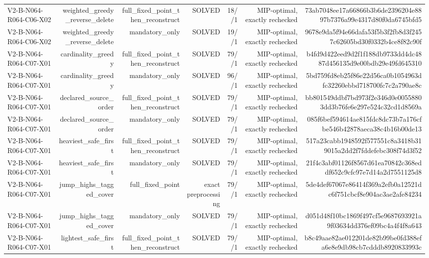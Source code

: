 {\begin{longtable}{lrrrrrr}
V2-B-N064-R064-C06-X02 & weighted\_greedy\_reverse\_delete & full\_fixed\_point\_then\_reconstruct & SOLVED & 18//1 & MIP-optimal, exactly rechecked & 73ab7048ee17a66866b3b6de2396204e8897b7376a99e4317d80f0da6745bfd5 \\
V2-B-N064-R064-C06-X02 & weighted\_greedy\_reverse\_delete & mandatory\_only & SOLVED & 19//1 & MIP-optimal, exactly rechecked & 9678e9da5f94e66dafa53f5b3f2fb8d3f2457c62605bd30f0332b4ce8f82c90f \\
V2-B-N064-R064-C07-X01 & cardinality\_greedy & full\_fixed\_point\_then\_reconstruct & SOLVED & 79//1 & MIP-optimal, exactly rechecked & b4fd9d422eed9d2f1f188db9733dd4dc4887d456135d9e00bdb29e49fd645310 \\
V2-B-N064-R064-C07-X01 & cardinality\_greedy & mandatory\_only & SOLVED & 96//1 & MIP-optimal, exactly rechecked & 5bd759fd8eb25f86e22d56ca0b1054963dfc32260ebbd718700fc7c2a790ae8c \\
V2-B-N064-R064-C07-X01 & declared\_source\_order & full\_fixed\_point\_then\_reconstruct & SOLVED & 79//1 & MIP-optimal, exactly rechecked & bb801549ddbf7bd973f2e346d0e00558803dd3b76fe6e297e524c32cd1d8569a \\
V2-B-N064-R064-C07-X01 & declared\_source\_order & mandatory\_only & SOLVED & 79//1 & MIP-optimal, exactly rechecked & 085f6bef594614ae815fdc8dc73b7a176cfbe546b42878aeca38c4b16b00de13 \\
V2-B-N064-R064-C07-X01 & heaviest\_safe\_first & full\_fixed\_point\_then\_reconstruct & SOLVED & 79//1 & MIP-optimal, exactly rechecked & 517a23cabb1948592f577551c8a3418b319015a2dd2f7fddefebc308f74d3f52 \\
V2-B-N064-R064-C07-X01 & heaviest\_safe\_first & mandatory\_only & SOLVED & 79//1 & MIP-optimal, exactly rechecked & 21f4c3abf01126f8567d61ea70842c368eddf652c9cfc97e7d14a2d7551125d8 \\
V2-B-N064-R064-C07-X01 & jump\_highs\_tagged\_cover & full\_fixed\_point & exact preprocessing & 79//1 & MIP-optimal, exactly rechecked & 5de4def67067e86414f369a2efb0a12521dc6f751cbcf8e904ac3ae2afe84234 \\
V2-B-N064-R064-C07-X01 & jump\_highs\_tagged\_cover & mandatory\_only & SOLVED & 79//1 & MIP-optimal, exactly rechecked & d051d48f10bc1869f497cf5e9687693921a9f03634dd376ef09bc4a4f4f8a643 \\
V2-B-N064-R064-C07-X01 & lightest\_safe\_first & full\_fixed\_point\_then\_reconstruct & SOLVED & 79//1 & MIP-optimal, exactly rechecked & b8c49aae82ae012201de82b99be0fd388efa6e8e9db98cb7cdddb8920833993c \\

\end{longtable}}
